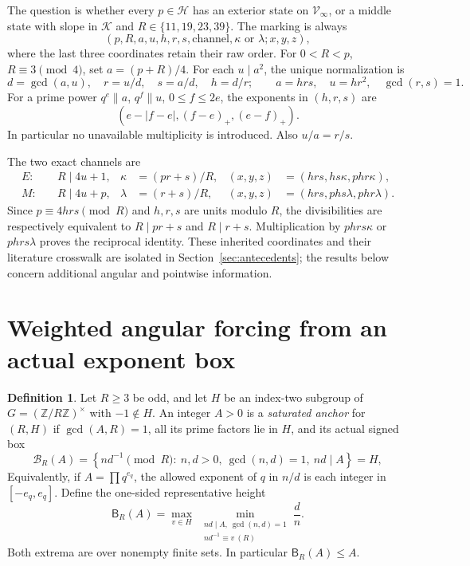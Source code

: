 \documentclass[11pt]{article}
\theoremstyle{definition}\newtheorem{definition}[theorem]{Definition}
\theoremstyle{remark}\newtheorem{remark}[theorem]{Remark}
\newcommand{\K}{\mathcal K}
\newcommand{\HH}{\mathcal H}
\newcommand{\B}{\mathsf B}
\newcommand{\V}{\mathcal V}
\begin{document}
The question is whether every $p\in\HH$ has an exterior state on $\V_\infty$, or a middle state with slope in $\K$ and $R\in\{11,19,23,39\}$. The marking is always
\[
 (p,R,a,u,h,r,s,\mathrm{channel},\kappa\text{ or }\lambda;
            x,y,z) ,
\]
where the last three coordinates retain their raw order. For $0<R<p$, $R\equiv3\pmod4$, set $a=(p+R)/4$. For each $u\mid a^2$, the unique normalization is
\begin{equation}\label{eq:normalize}
 d=\gcd(a,u),\quad r=u/d,\quad s=a/d,\quad h=d/r;
 \qquad a=hrs,\quad u=hr^2,\quad \gcd(r,s)=1.
\end{equation}
For a prime power $q^e\parallel a$, $q^f\parallel u$, $0\le f\le2e$, the exponents in $(h,r,s)$ are
\[
 (e-|f-e|,(f-e)_+,(e-f)_+).
\]
In particular no unavailable multiplicity is introduced. Also $u/a=r/s$.

The two exact channels are
\begin{align}
 E:&\quad R\mid4u+1,
 &\kappa&=(pr+s)/R,
 &(x,y,z)&=(hrs,hs\kappa,phr\kappa),\label{eq:E}\\
 M:&\quad R\mid4u+p,
 &\lambda&=(r+s)/R,
 &(x,y,z)&=(hrs,phs\lambda,phr\lambda).\label{eq:M}
\end{align}
Since $p\equiv4hrs\pmod R$ and $h,r,s$ are units modulo $R$, the divisibilities are respectively equivalent to $R\mid pr+s$ and $R\mid r+s$. Multiplication by $phrs\kappa$ or $phrs\lambda$ proves the reciprocal identity. These inherited coordinates and their literature crosswalk are isolated in Section~\ref{sec:antecedents}; the results below concern additional angular and pointwise information.

\section{Weighted angular forcing from an actual exponent box}
\begin{definition}
Let $R\ge3$ be odd, and let $H$ be an index-two subgroup of
$G=(\mathbb Z/R\mathbb Z)^\times$ with $-1\notin H$. An integer $A>0$ is a \emph{saturated anchor} for $(R,H)$ if $\gcd(A,R)=1$, all its prime factors lie in $H$, and its actual signed box
\begin{equation}\label{eq:box}
 \mathscr B_R(A)=
 \left\{nd^{-1}\pmod R:\ n,d>0,\ \gcd(n,d)=1,\ nd\mid A\right\}=H,
\end{equation}
Equivalently, if $A=\prod q^{e_q}$, the allowed exponent of $q$ in $n/d$ is each integer in $[-e_q,e_q]$. Define the one-sided representative height
\begin{equation}\label{eq:height}
 \B_R(A)=\max_{v\in H}\ 
 \min_{\substack{nd\mid A,\ \gcd(n,d)=1\\nd^{-1}\equiv v\ (R)}}\frac d n.
\end{equation}
Both extrema are over nonempty finite sets. In particular $\B_R(A)\le A$.
\end{definition}
\end{document}

